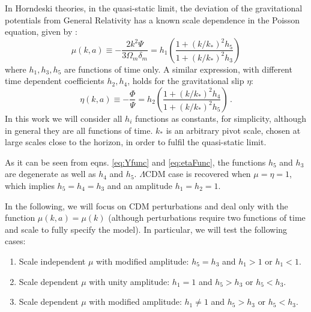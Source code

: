 In Horndeski theories, in the quasi-static limit, the deviation
of the gravitational potentials from General Relativity has a known
scale dependence in the Poisson equation, given by \citep{...}: 
\begin{equation}
\mu(k,a)\equiv-\frac{2k^{2}\Psi}{3\Omega_{m}\delta_{m}}=h_{1}\left(\frac{1+(k/k_{*})^{2}h_{5}}{1+(k/k_{*})^{2}h_{3}}\right)\label{eq:Yfunc}
\end{equation}
where $h_{1},h_{3},h_{5}$ are functions of time only. A similar expression,
with different time dependent coefficients $h_{2},h_{4}$, holds for
the gravitational slip $\eta$: 
\begin{equation}
\eta(k,a)\equiv-\frac{\Phi}{\Psi}=h_{2}\left(\frac{1+(k/k_{*})^{2}h_{4}}{1+(k/k_{*})^{2}h_{5}}\right)\,.\label{eq:etaFunc}
\end{equation}
In this work we will consider all $h_{i}$ functions as constants,
for simplicity, although in general they are all functions of time.
$k_{*}$ is an arbitrary pivot scale, chosen at large scales close
to the horizon, in order to fulfil the quasi-static limit.

As it can be seen from eqns. \ref{eq:Yfunc} and \ref{eq:etaFunc},
the functions $h_{5}$ and $h_{3}$ are degenerate as well as $h_{4}$
and $h_{5}$. %
$\Lambda\textrm{CDM}$ case is recovered when $\mu=\eta=1$, which
implies $h_{5}=h_{4}=h_{3}$ and an amplitude $h_{1}=h_{2}=1$.

In the following, we will focus on CDM perturbations and deal only
with the function $\mu(k,a)=\mu(k)$ (although perturbations require
two functions of time and scale to fully specify the model). In particular,
we will test the following cases: 
\begin{enumerate}
\item Scale independent $\mu$ with modified amplitude: $h_{5}=h_{3}$ and
$h_{1}>1$ or $h_{1}<1$. 
\item Scale dependent $\mu$ with unity amplitude: $h_{1}=1$ and $h_{5}>h_{3}$
or $h_{5}<h_{3}$. 
\item Scale dependent $\mu$ with modified amplitude: $h_{1}\neq1$ and
$h_{5}>h_{3}\mbox{ or }h_{5}<h_{3}$. 
\end{enumerate}


